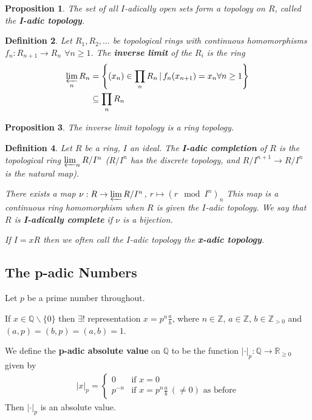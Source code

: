 \documentclass[a4paper]{article}
\newtheorem{definition}{Definition}
\newtheorem{prop}[definition]{Proposition}
\newcommand*\abs[1]{\left|#1\right|}
\begin{document}
\begin{prop}
	The set of all $I$-adically open sets form a topology on $R$, called the \textbf{I-adic topology}.
\end{prop}

\begin{definition}
	Let $R_1, R_2, \dots$ be topological rings with continuous homomorphisms $f_n:R_{n+1}\to R_n$ $\forall n \geq 1$. The \textbf{inverse limit} of the $R_i$ is the ring
	\begin{align*}
		\varprojlim_n R_n &= \left\{(x_n) \in \prod_n R_n \,|\, f_n(x_{n+1})=x_n \forall n \geq 1  \right\}\\
		&\subseteq \prod_n R_n
	\end{align*}
\end{definition}

\begin{prop}
	The inverse limit topology is a ring topology.
\end{prop}

\begin{definition}
	Let $R$ be a ring, $I$ an ideal. The \textbf{I-adic completion} of $R$ is the topological ring $\varprojlim_n R/I^n$ ($R/I^n$ has the discrete topology, and $R/I^{n+1} \to R/I^{n}$ is the natural map).
	
	There exists a map $\nu: R \to \varprojlim R/I^n$, $r \mapsto (r \mod I^n)_n$ This map is a continuous ring homomorphism when $R$ is given the $I$-adic topology. We say that $R$ is \textbf{I-adically complete} if $\nu$ is a bijection.
	
	If $I=xR$ then we often call the $I$-adic topology the \textbf{x-adic topology}.
\end{definition}

\subsection{The p-adic Numbers}
Let $p$ be a prime number throughout.

If $x \in \mathbb{Q} \backslash \{0\}$ then $\exists!$ representation $x=p^n \frac{a}{b}$,
where $n \in \mathbb{Z}$, $a \in \mathbb{Z}$,
$b \in \mathbb{Z}_{>0}$ and $(a,p)=(b,p)=(a,b)=1$.

We define the \textbf{p-adic absolute value} on $\mathbb{Q}$ to be the function $\abs{\cdot}_p: \mathbb{Q} \to \mathbb{R}_{\geq 0}$ given by
\begin{align*}
	\abs{x}_p =
	\begin{cases}
	0 &\text{if } x=0\\
	p^{-n}  &\text{if } x=p^n \frac{a}{b}\ (\neq 0) \text{ as before}
	\end{cases}
\end{align*}
Then $\abs{\cdot}_p$ is an absolute value.
\end{document}
